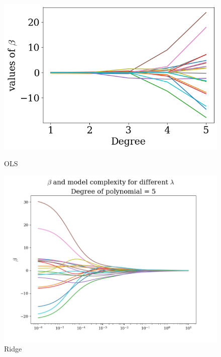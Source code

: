 \documentclass[twoside,11pt]{report}
\begin{document}
\begin{figure}[h]
\begin{minipage}[t]{.48\linewidth}
    \begin{center}
        \includegraphics[width=1.0\textwidth]{../runsAndAdditions/betaOverOrderOLS.png}
        \caption{OLS}\label{fig:betaOverOrderOLS}
\end{center}
\end{minipage}
\hspace{4mm}
\begin{minipage}[t]{.48\linewidth}
    \begin{center}
        \includegraphics[width=1.0\textwidth]{../runsAndAdditions/BetaOverLambdaRidge5.png}
        \caption{Ridge}\label{fig:betaOverLambdaRidge5}
    \end{center}
\end{minipage}
\end{figure}
\end{document}

